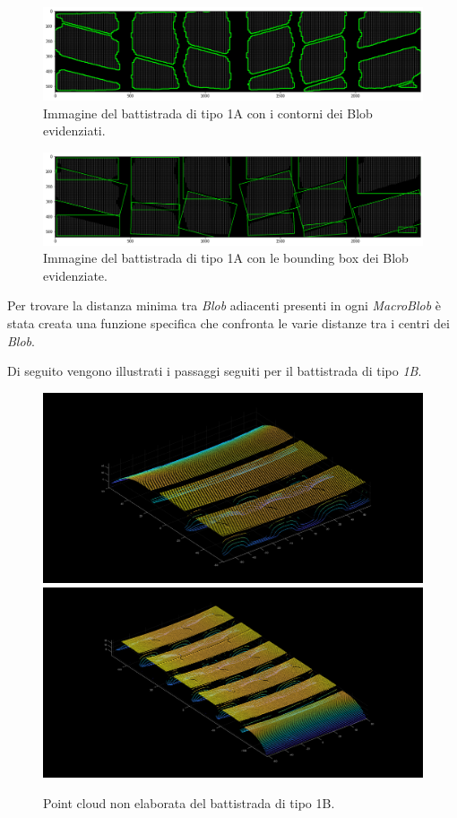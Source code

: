 \begin{figure}[H]
	\centering
	\includegraphics[width=0.9\columnwidth]{./pictures/batt_1a_analisi_11.png}
	\caption{Immagine del battistrada di tipo 1A con i contorni dei Blob evidenziati.}\label{fig:batt_1a_analisi_11}
\end{figure}

\begin{figure}[H]
	\centering
	\includegraphics[width=0.9\columnwidth]{./pictures/batt_1a_analisi_12.png}
	\caption{Immagine del battistrada di tipo 1A con le bounding box dei Blob evidenziate.}\label{fig:batt_1a_analisi_12}
\end{figure}

\noindent Per trovare la distanza minima tra \textit{Blob} adiacenti presenti in ogni \textit{MacroBlob} è stata creata una funzione specifica che confronta le varie distanze tra i centri dei \textit{Blob}.


\noindent Di seguito vengono illustrati i passaggi seguiti per il battistrada di tipo \textit{1B}.\\

\begin{figure}[H]
	\centering
	\includegraphics[width=0.45\columnwidth]{./pictures/batt_1b_analisi_1_1.png}
	\includegraphics[width=0.45\columnwidth]{./pictures/batt_1b_analisi_2_1.png}
	\caption{Point cloud non elaborata del battistrada di tipo 1B.}\label{fig:batt_1b_analisi_1}
\end{figure}

